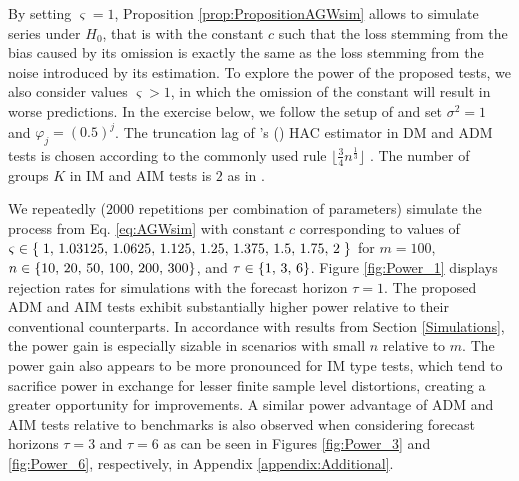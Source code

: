 \documentclass[11pt,dvipsnames]{article}
\newcommand{\splitatcommas}[1]{%
  \begingroup
  \begingroup\lccode`~=`, \lowercase{\endgroup
    \edef~{\mathchar\the\mathcode`, \penalty0 \noexpand\hspace{0pt plus 1em}}%
  }\mathcode`,="8000 #1%
  \endgroup
}
\newcommand{\possessivecite}[1]{\citeauthor{#1}'s (\citeyear{#1})}
\begin{document}
By setting  $  \varsigma=1$, Proposition \ref{prop:PropositionAGWsim} allows to simulate series under  $H_{0}$, that is with the constant $ c $ such that the loss stemming from the bias caused by its omission is exactly the same as the loss stemming from the noise introduced by its estimation. To explore the power of the proposed tests, we also consider values $ \varsigma>1$, in which the omission of the constant will result in worse predictions. In the exercise below, we follow the setup of \citet{mccrackenTestsConditionalPredictive2019} and set $ \sigma^{2} = 1 $ and $ \varphi_{j}=\left( 0.5\right) ^{j} $. The truncation lag of \possessivecite{neweySimplePositiveSemiDefinite1987} HAC estimator in DM and ADM tests is chosen according to the commonly used rule $ \lfloor{ \frac{3}{4}n^{\frac{1}{3}}  }\rfloor $ \citep[see e.g.][]{lazarusHARInferenceRecommendations2018}. The number of groups $ K $ in IM and AIM tests is $ 2 $ as in \cite{zhuCanTwoForecasts2020}.

We repeatedly ($ 2000 $ repetitions per combination of parameters) simulate the process from Eq. \ref{eq:AGWsim} with constant $ c $ corresponding to values of $ \splitatcommas{  \varsigma \in \left\lbrace \right.1,\, 1.03125,\, 1.0625,\, 1.125,\, 1.25,\, 1.375,\, 1.5,\, 1.75,\, 2 \left. \right\rbrace }$ for  $ m=100 $, $ \splitatcommas{ n \in \left\lbrace 10,\,20,\,50,\,100,\, 200,\, 300\right\rbrace }$, and $ \splitatcommas{\tau \in  \left\lbrace 1,\,3,\,6\right\rbrace} $. Figure \ref{fig:Power_1} displays rejection rates for simulations with the forecast horizon $ \tau = 1 $. The proposed ADM and AIM tests exhibit substantially higher power relative to their conventional counterparts. In accordance with results from Section \ref{Simulations}, the power gain is especially sizable in scenarios with small $ n $ relative to $ m $. The power gain also appears to be more pronounced for IM type tests, which tend to sacrifice power in exchange for lesser finite sample level distortions, creating a greater opportunity for improvements. A similar power advantage of ADM and AIM tests relative to benchmarks is also observed when considering forecast horizons $ \tau = 3 $ and $ \tau = 6 $ as can be seen in Figures \ref{fig:Power_3} and \ref{fig:Power_6}, respectively, in Appendix \ref{appendix:Additional}.
\end{document}
